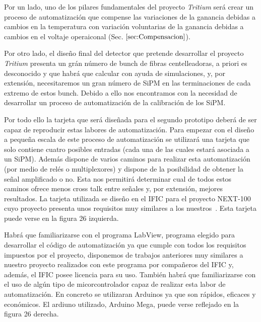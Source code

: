 \begin{enumerate}
Por un lado, uno de los pilares fundamentales del proyecto \textit{Tritium} será crear un proceso de automatización que compense las variaciones de la ganancia debidas a cambios en la temperatura con variación voluntarias de la ganancia debidas a cambios en el voltaje operaiconal (Sec. $\ref{sec:Compensacion}$).

Por otro lado, el diseño final del detector que pretende desarrollar el proyecto \textit{Tritium} presenta un grán número de bunch de fibras centelleadoras, a priori es desconocido y que habrá que calcular con ayuda de simulaciones, y, por extensión, necesitaremos un gran número de SiPM en las terminaciones de cada extremo de estos bunch. Debido a ello nos encontramos con la necesidad de desarrollar un proceso de automatización de la calibración de los SiPM.  

Por todo ello la tarjeta que será diseñada para el segundo prototipo deberá de ser capaz de reproducir estas labores de automatización. Para empezar con el diseño a pequeña escala de este proceso de automatización se utilizará una tarjeta que solo contiene cuatro posibles entradas (cada una de las cuales estará asociada a un SiPM). Además dispone de varios caminos para realizar esta automatización (por medio de relés o multiplexores) y dispone de la posibilidad de obtener la señal amplificado o no. Esta nos permitirá determinar cual de todos estos caminos ofrece menos cross talk entre señales y, por extensión, mejores resultados. La tarjeta utilizada se diseño en el IFIC para el proyecto NEXT-100 cuyo proyecto presenta unos requisitos muy similares a los nuestros~\cite{Marc}. Esta tarjeta puede verse en la figura 26 izquierda.

Habrá que familiarizarse con el programa LabView, programa elegido para desarrollar el código de automatización ya que cumple con todos los requisitos impuestos por el proyecto, disponemos de trabajos anteriores muy similares a nuestro proyecto realizados con este programa por compañeros del IFIC y, además, el IFIC posee licencia para su uso. También habrá que familiarizarse con el uso de algún tipo de micorcontrolador capaz de realizar esta labor de automatización. En concreto se utilizaran Arduinos ya que son rápidos, eficaces y económicos. El ardiuno utilizado, Arduino Mega, puede verse reflejado en la figura 26 derecha.


\end{enumerate}

